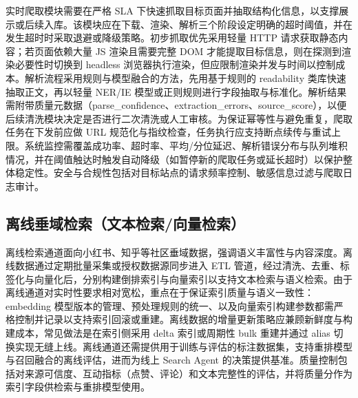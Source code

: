 实时爬取模块需要在严格 SLA 下快速抓取目标页面并抽取结构化信息，以支撑展示或后续入库。该模块应在下载、渲染、解析三个阶段设定明确的超时阈值，并在发生超时时采取退避或降级策略。初步抓取优先采用轻量 HTTP 请求获取静态内容；若页面依赖大量 JS 渲染且需要完整 DOM 才能提取目标信息，则在探测到渲染必要性时切换到 headless 浏览器执行渲染，但应限制渲染并发与时间以控制成本。解析流程采用规则与模型融合的方法，先用基于规则的 readability 类库快速抽取正文，再以轻量 NER/IE 模型或正则规则进行字段抽取与标准化。解析结果需附带质量元数据（parse\_confidence、extraction\_errors、source\_score），以便后续清洗模块决定是否进行二次清洗或人工审核。为保证幂等性与避免重复，爬取任务在下发前应做 URL 规范化与指纹检查，任务执行应支持断点续传与重试上限。系统监控需覆盖成功率、超时率、平均/分位延迟、解析错误分布与队列堆积情况，并在阈值触达时触发自动降级（如暂停新的爬取任务或延长超时）以保护整体稳定性。安全与合规性包括对目标站点的请求频率控制、敏感信息过滤与爬取日志审计。

\subsection{离线垂域检索（文本检索/向量检索）}
离线检索通道面向小红书、知乎等社区垂域数据，强调语义丰富性与内容深度。离线数据通过定期批量采集或授权数据源同步进入 ETL 管道，经过清洗、去重、标签化与向量化后，分别构建倒排索引与向量索引以支持文本检索与语义检索。由于离线通道对实时性要求相对宽松，重点在于保证索引质量与语义一致性：embedding 模型版本的管理、预处理规则的统一、以及向量索引构建参数都需严格控制并记录以支持索引回滚或重建。离线数据的增量更新策略应兼顾新鲜度与构建成本，常见做法是在索引侧采用 delta 索引或周期性 bulk 重建并通过 alias 切换实现无缝上线。离线通道还需提供用于训练与评估的标注数据集，支持重排模型与召回融合的离线评估，进而为线上 Search Agent 的决策提供基准。质量控制包括对来源可信度、互动指标（点赞、评论）和文本完整性的评估，并将质量分作为索引字段供检索与重排模型使用。

